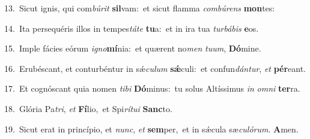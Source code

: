 {\numbfont\textcolor{\numbcolor}{13.}}~Sicut ignis, qui com\-\textit{bú}\-\textit{rit} \textbf{sil}\-vam:~\star et sicut flamma \textit{com}\-\textit{bú}\textit{rens} \textbf{mon}\-tes:\par
{\numbfont\textcolor{\numbcolor}{14.}}~Ita persequéris illos in tempes\-\textit{tá}\-\textit{te} \textbf{tu}\-a:~\star et in ira tua \textit{tur}\-\textit{bá}\textit{bis} \textbf{e}\-os.\par
{\numbfont\textcolor{\numbcolor}{15.}}~Imple fácies eórum \textit{i}\-\textit{gno}\textbf{mí}nia:~\star et quærent no\textit{men} \textit{tu}\-\textit{um}, \textbf{Dó}\-mine.\par
{\numbfont\textcolor{\numbcolor}{16.}}~Erubéscant, et conturbéntur in sǽ\-\textit{cu}\-\textit{lum} \textbf{sǽ}\-culi:~\star et confun\-\textit{dán}\-\textit{tur}, \textit{et} \textbf{pér}\-eant.\par
{\numbfont\textcolor{\numbcolor}{17.}}~Et cognóscant quia nomen \textit{ti}\-\textit{bi} \textbf{Dó}\-minus:~\star tu solus Altíssimus \textit{in} \textit{om}\-\textit{ni} \textbf{ter}\-ra.\par
{\numbfont\textcolor{\numbcolor}{18.}}~Glória Pa\-\textit{tri}\-, \textit{et} \textbf{Fí}\-lio,~\star et Spi\-\textit{rí}\-\textit{tu}\textit{i} \textbf{Sanc}\-to.\par
{\numbfont\textcolor{\numbcolor}{19.}}~Sicut erat in princípio, et \textit{nunc}\-, \textit{et} \textbf{sem}\-per,~\star et in sǽcula sæ\-\textit{cu}\-\textit{ló}\textit{rum}. \textbf{A}\-men.\par
